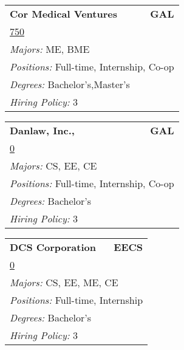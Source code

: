 \documentclass[twoside]{article}
\begin{document}
\begin{center}
\begin{multicols}{3}
\begin{FlushLeft}
\begin{minipage}{.9\columnwidth}\begin{tabularx}{.95\columnwidth}{Xr}
                 {\Large\bf Cor Medical Ventures} & {\Large\bf GAL}\\
    \multicolumn{2}{p{.95\columnwidth}}{\url{750}}\\
    \multicolumn{2}{p{.95\columnwidth}}{\emph{Majors:} ME, BME}\\
    \multicolumn{2}{p{.95\columnwidth}}{\emph{Positions:} Full-time, Internship, Co-op}\\
    \multicolumn{2}{p{.95\columnwidth}}{\emph{Degrees:} Bachelor's,Master's}\\
    \multicolumn{2}{p{.95\columnwidth}}{\emph{Hiring Policy:} 3}\\
    \end{tabularx}
    
\end{minipage}
 
\begin{minipage}{.9\columnwidth}\begin{tabularx}{.95\columnwidth}{Xr}
                 {\Large\bf Danlaw, Inc.,} & {\Large\bf GAL}\\
    \multicolumn{2}{p{.95\columnwidth}}{\url{0}}\\
    \multicolumn{2}{p{.95\columnwidth}}{\emph{Majors:} CS, EE, CE}\\
    \multicolumn{2}{p{.95\columnwidth}}{\emph{Positions:} Full-time, Internship, Co-op}\\
    \multicolumn{2}{p{.95\columnwidth}}{\emph{Degrees:} Bachelor's}\\
    \multicolumn{2}{p{.95\columnwidth}}{\emph{Hiring Policy:} 3}\\
    \end{tabularx}
    
\end{minipage}
 
\begin{minipage}{.9\columnwidth}\begin{tabularx}{.95\columnwidth}{Xr}
                 {\Large\bf DCS Corporation} & {\Large\bf EECS}\\
    \multicolumn{2}{p{.95\columnwidth}}{\url{0}}\\
    \multicolumn{2}{p{.95\columnwidth}}{\emph{Majors:} CS, EE, ME, CE}\\
    \multicolumn{2}{p{.95\columnwidth}}{\emph{Positions:} Full-time, Internship}\\
    \multicolumn{2}{p{.95\columnwidth}}{\emph{Degrees:} Bachelor's}\\
    \multicolumn{2}{p{.95\columnwidth}}{\emph{Hiring Policy:} 3}\\
    \end{tabularx}
    

\end{minipage}
\end{FlushLeft}
\end{multicols}
\end{center}
\end{document}
